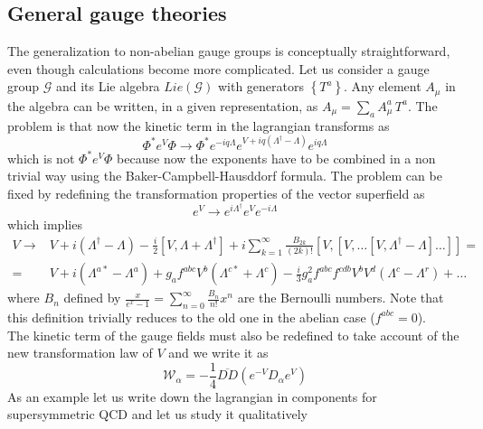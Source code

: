 \documentclass[12pt]{article}
\begin{document}
\subsection{General gauge theories}
The generalization to non-abelian gauge groups is conceptually straightforward, even though calculations become more complicated. Let us consider a gauge group $\mathcal{G}$ and its Lie algebra $Lie(\mathcal{G})$ with generators $\left\{T^a\right\}$.
Any element $A_\mu$ in the algebra can be written, in a given representation, as $A_\mu = \sum_a A_\mu^a \, T^a$. The problem is that now the kinetic term in the lagrangian transforms as 
\begin{equation*}
  \Phi^* e^V \Phi \to \Phi^* e^{-iq\Lambda} e^{V + iq(\Lambda^\dagger - \Lambda)} e^{iq\Lambda}
\end{equation*}
which is not $\Phi^* e^V \Phi$ because now the exponents have to be combined in a non trivial way using the Baker-Campbell-Hausddorf formula. The problem can be fixed by redefining the transformation properties of the vector superfield as 
\begin{equation*}
  e^V \to e^{i\Lambda^\dagger} e^V e^{-i\Lambda}
\end{equation*}
which implies 
\begin{align*}
  V \rightarrow &V + i\left(\Lambda^{\dagger}-\Lambda\right)-\frac{i}{2}\left[V, \Lambda+\Lambda^{\dagger}\right] 
  + i \sum_{k=1}^{\infty} \frac{B_{2 k}}{(2 k) !}\left[V,\left[V, \ldots\left[V, \Lambda^{\dagger}-\Lambda\right] \ldots\right]\right] = \\
  = & V + i\left(\Lambda^{a *}-\Lambda^{a}\right)+g_{a} f^{a b c} V^{b}\left(\Lambda^{c *}+\Lambda^{c}\right) 
  -\frac{i}{3} g_{a}^{2} f^{a b c} f^{c d b} V^{b} V^{d}\left(\Lambda^{c}-\Lambda^{r}\right)+\ldots
\end{align*}
where $B_n$ defined by $\frac{x}{e^{x}-1}=\sum_{n=0}^{\infty} \frac{B_{n}}{n !} x^{n}$ are the Bernoulli numbers. Note that this definition trivially reduces to the old one in the abelian case ($f^{abc}=0$). \\
The kinetic term of the gauge fields must also be redefined to take account of the new transformation law of $V$ and we write it as 
\begin{equation*}
  \mathcal{W}_\alpha = -\frac{1}{4} \overline{DD} (e^{-V}D_{\alpha}e^V)
\end{equation*}
As an example let us write down the lagrangian in components for supersymmetric QCD and let us study it qualitatively
\end{document}
